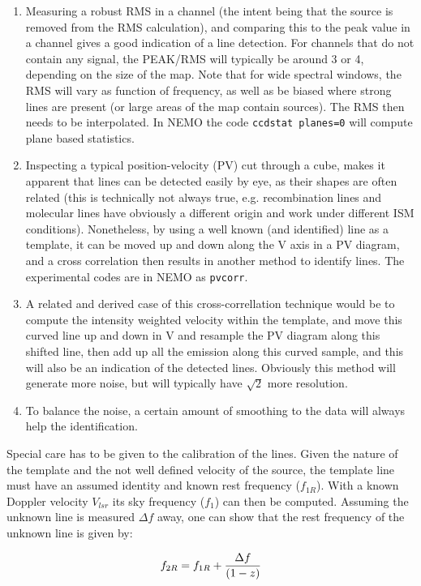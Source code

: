 \documentclass[preprint]{aastex} %
\begin{document}
\begin{enumerate}

\item
Measuring a robust RMS in a channel (the intent being that the source is removed from the 
RMS calculation), and comparing this to the peak value in a channel gives a good 
indication of a line detection. For channels that do not contain any signal, 
the PEAK/RMS will typically be around 3 or 4, depending on the size of the map.
Note that for wide spectral windows, the RMS will vary as function of frequency,
as well as be biased where strong lines are present (or large areas of the map
contain sources). The RMS then needs to be interpolated. In NEMO the code
{\tt ccdstat planes=0} will compute plane based statistics.

\item
Inspecting a typical position-velocity (PV) cut through a cube, makes it apparent
that lines can be detected easily by eye, as their shapes are often related
(this is technically not always true, e.g. recombination lines and molecular lines have
obviously a different origin and work under different ISM conditions). Nonetheless,
by using a well known (and identified) line as a template, it can be moved up and down
along the V axis in a PV diagram, and a cross correlation then results in another method
to identify lines. The experimental codes are in NEMO as {\tt pvcorr}.


\item
A related and derived case of this
cross-correllation technique would be to compute the intensity
weighted velocity within the template, and move this curved line up and down in V and resample
the PV diagram along this shifted line, then add up all the emission along this curved
sample, and this will also be an indication of the detected lines.  Obviously this
method will generate more noise, but will typically have $\sqrt{2}$ more resolution.

\item
To balance the noise, a certain amount of smoothing to the data will always help
the identification.


\end{enumerate}

Special care has to be given to the calibration of the lines. Given the nature of
the template and the not well defined velocity of the source, the template line
must have an assumed identity and known rest frequency  ($f_{1R}$). 
With a known Doppler velocity $V_{lsr}$ its sky frequency ($f_1$) 
can then be computed.  Assuming the unknown line is measured ${\Delta f}$ away, one
can show that the rest frequency of the unknown line is given by:


$$
 f_{2R} = f_{1R} + {  {\Delta f} \over { (1-z) }}
$$
\end{document}
